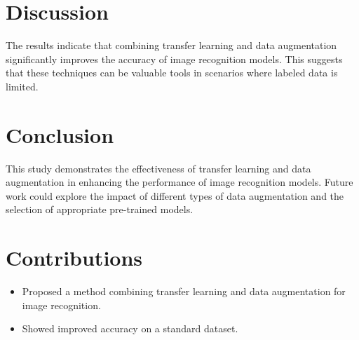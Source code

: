 \documentclass{article}
\begin{document}
\section{Discussion}
The results indicate that combining transfer learning and data augmentation significantly improves the accuracy of image recognition models. This suggests that these techniques can be valuable tools in scenarios where labeled data is limited.

\section{Conclusion}
This study demonstrates the effectiveness of transfer learning and data augmentation in enhancing the performance of image recognition models. Future work could explore the impact of different types of data augmentation and the selection of appropriate pre-trained models.

\section{Contributions}
\begin{itemize}
    \item Proposed a method combining transfer learning and data augmentation for image recognition.
    \item Showed improved accuracy on a standard dataset.
\end{itemize}



\end{document}
